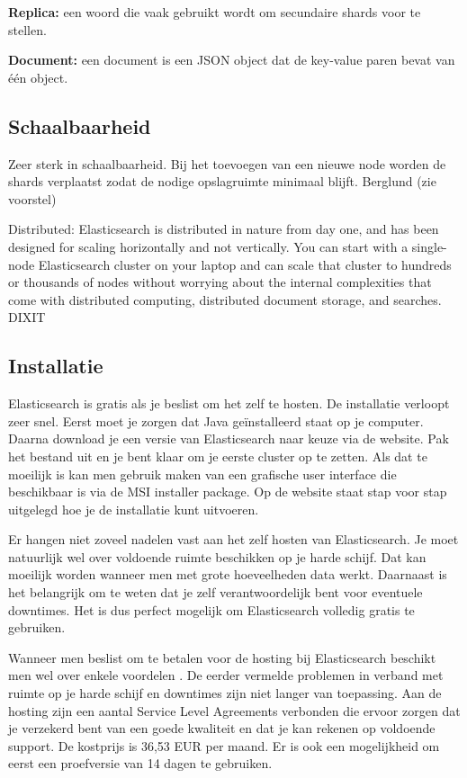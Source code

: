\textbf{Replica:} een woord die vaak gebruikt wordt om secundaire shards voor te stellen.

\textbf{Document:} een document is een JSON object dat de key-value paren bevat van één object.

\subsection{Schaalbaarheid}

Zeer sterk in schaalbaarheid. Bij het toevoegen van een nieuwe node worden de shards verplaatst zodat de nodige opslagruimte minimaal blijft. Berglund (zie voorstel)  

Distributed: Elasticsearch is distributed in nature from day one, and has been designed for scaling horizontally and not vertically. You can start with a single-node Elasticsearch cluster on your laptop and can scale that cluster to hundreds or thousands of nodes without worrying about the internal complexities that come with distributed computing, distributed document storage, and searches. DIXIT

\subsection{Installatie}
\label{Installatie}

Elasticsearch is gratis als je beslist om het zelf te hosten. De installatie verloopt zeer snel. Eerst moet je zorgen dat Java geïnstalleerd staat op je computer. Daarna download je een versie van Elasticsearch naar keuze via de website. Pak het bestand uit en je bent klaar om je eerste cluster op te zetten. Als dat te moeilijk is kan men gebruik maken van een grafische user interface die beschikbaar is via de MSI installer package. Op de website staat stap voor stap uitgelegd hoe je de installatie kunt uitvoeren. 


Er hangen niet zoveel nadelen vast aan het zelf hosten van Elasticsearch. Je moet natuurlijk wel over voldoende ruimte beschikken op je harde schijf. Dat kan moeilijk worden wanneer men met grote hoeveelheden data werkt. Daarnaast is het belangrijk om te weten dat je zelf verantwoordelijk bent voor eventuele downtimes. Het is dus perfect mogelijk om Elasticsearch volledig gratis te gebruiken. 

Wanneer men beslist om te betalen voor de hosting bij Elasticsearch beschikt men wel over enkele voordelen . De eerder vermelde problemen in verband met ruimte op je harde schijf en downtimes zijn niet langer van toepassing.  Aan de hosting zijn een aantal Service Level Agreements verbonden die ervoor zorgen dat je verzekerd bent van een goede kwaliteit en dat je kan rekenen op voldoende support. De kostprijs is 36,53 EUR per maand. Er is ook een mogelijkheid om eerst een proefversie van 14 dagen te gebruiken.

